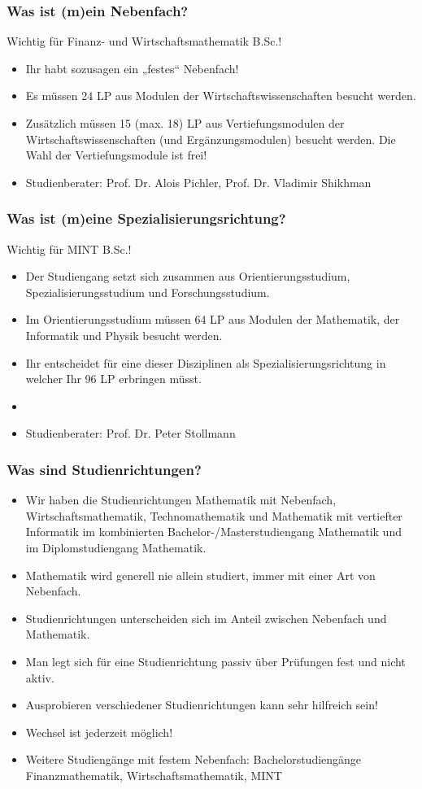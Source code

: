 \documentclass[10pt]{beamer}
\makeatletter
\newcommand{\highl}[1]{\color{tuccolor@ma}#1\color{black}}
\makeatother
\begin{document}
\begin{frame}
	\frametitle{Was ist (m)ein Nebenfach?}
	\highl{Wichtig für Finanz- und Wirtschafts­mathematik B.Sc.!}
	\begin{itemize}
		\item Ihr habt sozusagen ein „festes“ Nebenfach!
		\item Es müssen 24 LP aus Modulen der Wirtschaftswissenschaften besucht werden.
		\item Zusätzlich müssen 15 (max. 18) LP aus Vertiefungsmodulen der Wirtschaftswissenschaften (und Ergänzungsmodulen) besucht werden. Die Wahl der Vertiefungsmodule ist frei!
		\item Studienberater: Prof. Dr. Alois Pichler, Prof. Dr. Vladimir Shikhman
	\end{itemize}
\end{frame}

\begin{frame}
	\frametitle{Was ist (m)eine Spezialisierungsrichtung?}
	\highl{Wichtig für MINT B.Sc.!}
	\begin{itemize}
		\item Der Studiengang setzt sich zusammen aus Orientierungsstudium, Spezialisierungsstudium und Forschungsstudium. 
		\item Im Orientierungsstudium müssen 64 LP aus Modulen der Mathematik, der Informatik und Physik besucht werden.
		\item Ihr entscheidet für eine dieser Disziplinen als Spezialisierungsrichtung in welcher Ihr 96 LP erbringen müsst. 
		\item 
		\item Studienberater: Prof. Dr. Peter Stollmann
	\end{itemize}
\end{frame}

\begin{frame}
	\frametitle{Was sind Studienrichtungen?}
	\begin{itemize}
		\item Wir haben die Studienrichtungen Mathematik mit Nebenfach, Wirtschaftsmathematik, Technomathematik und Mathematik mit vertiefter Informatik im kombinierten Bachelor-/Masterstudiengang Mathematik und im Diplomstudiengang Mathematik.
		\item Mathematik wird generell nie allein studiert, immer mit einer Art von Nebenfach.
		\item Studienrichtungen unterscheiden sich im Anteil zwischen Nebenfach und Mathematik.
		\item Man legt sich für eine Studienrichtung passiv über Prüfungen fest und nicht aktiv.
		\item Ausprobieren verschiedener Studienrichtungen kann sehr hilfreich sein!
		\item Wechsel ist jederzeit möglich!
		\item Weitere Studiengänge mit festem Nebenfach: Bachelorstudiengänge Finanzmathematik, Wirtschaftsmathematik, MINT
	\end{itemize}
\end{frame}
\end{document}
